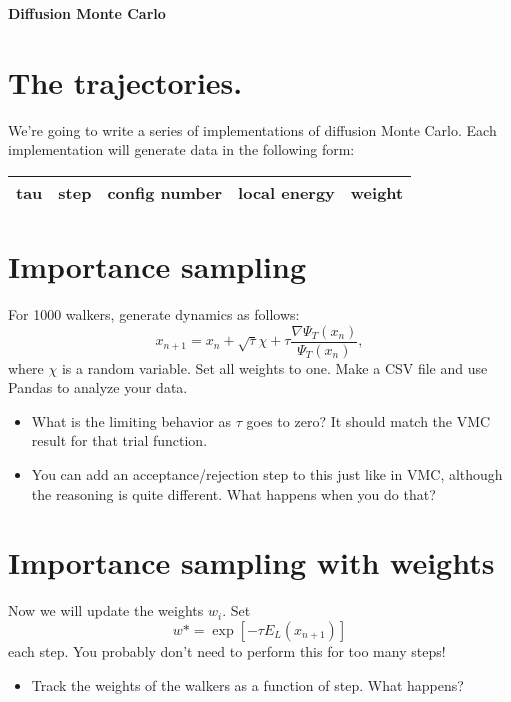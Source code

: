 \documentclass[12pt]{article}
\begin{document}
	{\bf Diffusion Monte Carlo } 

\section*{The trajectories.} 

We're going to write a series of implementations of diffusion Monte Carlo.
Each implementation will generate data in the following form: 

\begin{tabular}{ccccc}
tau&step&config number&	local energy&weight\\
\hline
\end{tabular}


	
\section{Importance sampling} 

For 1000 walkers, generate dynamics as follows: 
\begin{equation}
x_{n+1} = x_n + \sqrt{\tau}\chi + \tau \frac{\nabla \Psi_T(x_n)}{\Psi_T(x_n)},
\end{equation}
where $\chi$ is a random variable. 
Set all weights to one.
Make a CSV file and use Pandas to analyze your data. 


\begin{itemize}
\item What is the limiting behavior as $\tau$ goes to zero? It should match the VMC result for that trial function.	
\item You can add an acceptance/rejection step to this just like in VMC, although the reasoning is quite different. What happens when you do that?
\end{itemize}

\section{Importance sampling with weights}
Now we will update the weights $w_i$. Set 
\begin{equation}
w*=	\exp[-\tau E_L(x_{n+1})] 
\end{equation}
each step.
You probably don't need to perform this for too many steps!

\begin{itemize}
\item Track the weights of the walkers as a function of step. What happens?
\end{itemize}
\end{document}
